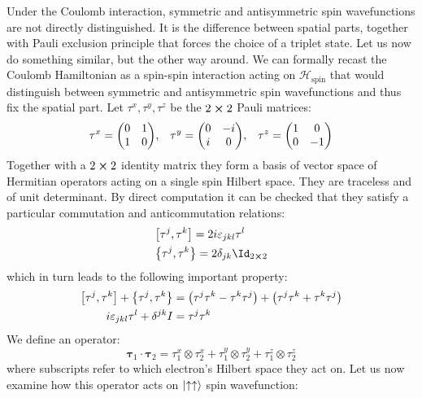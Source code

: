 Under the Coulomb interaction, symmetric and antisymmetric spin wavefunctions are not
directly distinguished. It is the difference between spatial parts, together with Pauli
exclusion principle that forces the choice of a triplet state. Let us now do something
similar, but the other way around. We can formally recast the Coulomb Hamiltonian as a
spin-spin interaction acting on \(\mathcal{H}_{\textrm{spin}}\) that would distinguish
between symmetric and antisymmetric spin wavefunctions and thus fix the spatial part.
Let \(\tau^x,\tau^y,\tau^z\) be the \(2\cross 2\) Pauli matrices:
\begin{equation}
\tau^x = \mqty(\pmat{1}),\;\;\;\tau^y = \mqty(\pmat{2}),\;\;\;\tau^z= \mqty(\pmat{3})
\label{eq:Pauli matrices}
\end{equation}
Together with a \(2\cross 2\) identity matrix they form a basis of vector space of
Hermitian operators acting on a single spin Hilbert space.
They are traceless and of unit determinant. By direct computation it can be checked that
they satisfy a particular commutation and anticommutation relations:
\begin{align}
    &\comm{\tau^j}{\tau^k} = 2 i \varepsilon_{jkl}\tau^{l}\\
    &\anticommutator{\tau^j}{\tau^k} = 2 \delta_{jk} \Id_{2\cross2}
\end{align}
which in turn leads to the following important property:
\begin{align}
        \comm{\tau^{j}}{\tau^{k}} + \anticommutator{\tau^{j}}{\tau^{k}} 
    &=\left(\tau^{j} \tau^{k}-\tau^{k} \tau^{j}\right)+\left(\tau^{j} \tau^{k}+\tau^{k} 
    \tau^{j}\right) \nonumber \\
    i \varepsilon_{j k l} \tau^{l}+\delta^{j k} I &= \tau^{j} \tau^{k}
\end{align}
We define an operator:
\begin{equation}
    \bm{\tau}_1 \cdot \bm{\tau}_2 = \tau_1^x \otimes \tau_2^x + \tau_1^y \otimes \tau_2^y +
    \tau_1^z \otimes \tau_2^z  
\end{equation}
where subscripts refer to which electron's Hilbert space they act on. 
Let us now examine how this operator acts on \(\ket{\uparrow\uparrow}\) spin wavefunction:
